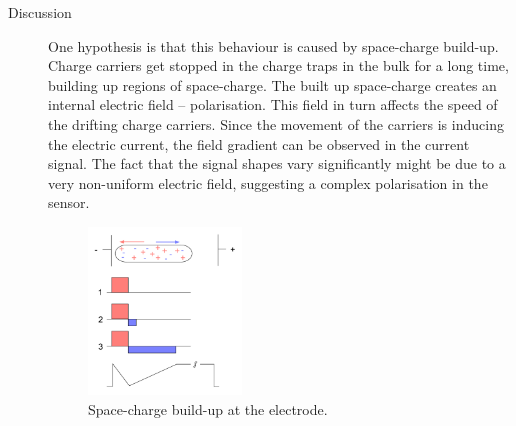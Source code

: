 \begin{description}
\item[Discussion] 

One hypothesis is that this behaviour is caused by space-charge build-up. Charge carriers get stopped in the charge traps in the bulk for a long time, building up regions of space-charge. The built up space-charge creates an internal electric field -- polarisation. This field in turn affects the speed of the drifting charge carriers. Since the movement of the carriers is inducing the electric current, the field gradient can be observed in the current signal. The fact that the signal shapes vary significantly might be due to a very non-uniform electric field, suggesting a complex polarisation in the sensor.
\begin{figure}[!t]
\begin{center}
\includegraphics[width=0.4\textwidth]{03_measurement_results/plots/elfield}
\caption{Space-charge build-up at the electrode.}
\label{fig:elfield}
\end{center}
\end{figure}


\end{description}
